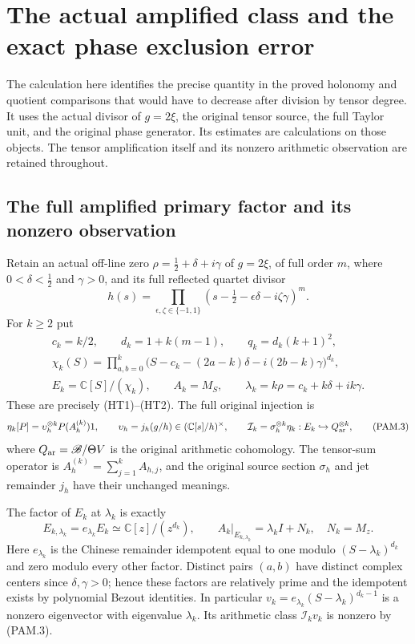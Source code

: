 \section{The actual amplified class and the exact phase exclusion error}
\label{CFStage:sec:pam-phase}

The calculation here identifies the precise quantity in the proved
holonomy and quotient comparisons that would have to decrease after
division by tensor degree. It uses the actual divisor of \(g=2\xi\),
the original tensor source, the full Taylor unit, and the original
phase generator. Its estimates are calculations on those objects.
The tensor amplification itself and its nonzero arithmetic observation
are retained throughout.

\subsection{The full amplified primary factor and its nonzero observation}

Retain an actual off-line zero
\(\rho=\tfrac12+\delta+i\gamma\) of \(g=2\xi\), of full order \(m\),
where \(0<\delta<\tfrac12\) and \(\gamma>0\), and its full reflected
quartet divisor
\[
 h(s)=\prod_{\epsilon,\zeta\in\{-1,1\}}
     (s-\tfrac12-\epsilon\delta-i\zeta\gamma)^m .
 \tag{PAM.1}\label{CFStage:eq:pam-packet}
\]
For \(k\ge2\) put
\[
 \begin{gathered}
 c_k=k/2,\qquad d_k=1+k(m-1),\qquad q_k=d_k(k+1)^2,\\
 \chi_k(S)=\prod_{a,b=0}^k
 \bigl(S-c_k-(2a-k)\delta-i(2b-k)\gamma\bigr)^{d_k},\\
 E_k=\mathbb C[S]/(\chi_k),\qquad A_k=M_S,\qquad
 \lambda_k=k\rho=c_k+k\delta+ik\gamma.
 \end{gathered}
 \tag{PAM.2}\label{CFStage:eq:pam-grid}
\]
These are precisely (HT1)--(HT2). The full original injection is
\[
 \eta_k[P]=\upsilon_h^{\otimes k}P(A_h^{(k)})1,\qquad
 \upsilon_h=j_h(g/h)\in(\mathbb C[s]/h)^\times,\qquad
 \mathcal I_k=\sigma_h^{\otimes k}\eta_k:
      E_k\hookrightarrow Q_{\rm ar}^{\otimes k},
 \tag{PAM.3}\label{CFStage:eq:pam-injection}
\]
where \(Q_{\rm ar}=\mathscr B/\Theta V\) is the original arithmetic
cohomology. The tensor-sum operator is
\(A_h^{(k)}=\sum_{j=1}^k A_{h,j}\), and the original source section
\(\sigma_h\) and jet remainder \(j_h\) have their unchanged meanings.

The factor of \(E_k\) at \(\lambda_k\) is exactly
\[
 E_{k,\lambda_k}
 =e_{\lambda_k}E_k\simeq\mathbb C[z]/(z^{d_k}),\qquad
 A_k|_{E_{k,\lambda_k}}=\lambda_k I+N_k,\quad N_k=M_z .
 \tag{PAM.4}\label{CFStage:eq:pam-primary}
\]
Here \(e_{\lambda_k}\) is the Chinese remainder idempotent equal to
one modulo \((S-\lambda_k)^{d_k}\) and zero modulo every other
factor. Distinct pairs \((a,b)\) have distinct complex centers since
\(\delta,\gamma>0\); hence these factors are relatively prime and
the idempotent exists by polynomial Bezout identities. In particular
\(v_k=e_{\lambda_k}(S-\lambda_k)^{d_k-1}\) is a nonzero eigenvector
with eigenvalue \(\lambda_k\). Its arithmetic class
\(\mathcal I_kv_k\) is nonzero by (PAM.3).

